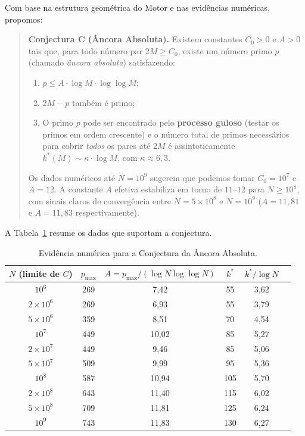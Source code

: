 \documentclass[11pt]{article}
\begin{document}
	Com base na estrutura geométrica do Motor e nas evidências numéricas, propomos:
	
	\begin{quote}
		\textbf{Conjectura C (Âncora Absoluta).} Existem constantes $C_0>0$ e $A>0$ tais que, para todo número par $2M \ge C_0$, existe um número primo $p$ (chamado \emph{âncora absoluta}) satisfazendo:
		\begin{enumerate}
			\item $p \le A \cdot \log M \cdot \log\log M$;
			\item $2M-p$ também é primo;
			\item O primo $p$ pode ser encontrado pelo \textbf{processo guloso} (testar os primos em ordem crescente) e o número total de primos necessários para cobrir \emph{todos} os pares até $2M$ é assintoticamente $k^*(M) \sim \kappa \cdot \log M$, com $\kappa \approx 6,3$.
		\end{enumerate}
		Os dados numéricos até $N=10^9$ sugerem que podemos tomar $C_0 = 10^7$ e $A = 12$. A constante $A$ efetiva estabiliza em torno de $11$--$12$ para $N \ge 10^8$, com sinais claros de convergência entre $N=5\times10^8$ e $N=10^9$ ($A=11,81$ e $A=11,83$ respectivamente).
	\end{quote}
	
	A Tabela~\ref{tab:evidencia} resume os dados que suportam a conjectura.
	
	\begin{table}[h]
		\centering
		\caption{Evidência numérica para a Conjectura da Âncora Absoluta.}
		\label{tab:evidencia}
		\begin{tabular}{cccccc}
			\toprule
			$N$ (limite de $C$) & $p_{\max}$ & $A = p_{\max}/(\log N\log\log N)$ & $k^*$ & $k^*/\log N$ \\
			\midrule
			$10^6$         &  269 &  7,42 &  55 & 3,62 \\
			$2\times10^6$  &  269 &  6,93 &  55 & 3,79 \\
			$5\times10^6$  &  359 &  8,51 &  70 & 4,54 \\
			$10^7$         &  449 & 10,02 &  85 & 5,27 \\
			$2\times10^7$  &  449 &  9,46 &  85 & 5,06 \\
			$5\times10^7$  &  509 &  9,99 &  95 & 5,36 \\
			$10^8$         &  587 & 10,94 & 105 & 5,70 \\
			$2\times10^8$  &  643 & 11,40 & 115 & 6,02 \\
			$5\times10^8$  &  709 & 11,81 & 125 & 6,24 \\
			$10^9$         &  743 & 11,83 & 130 & 6,27 \\
			\bottomrule
		\end{tabular}
	\end{table}
	
\end{document}
